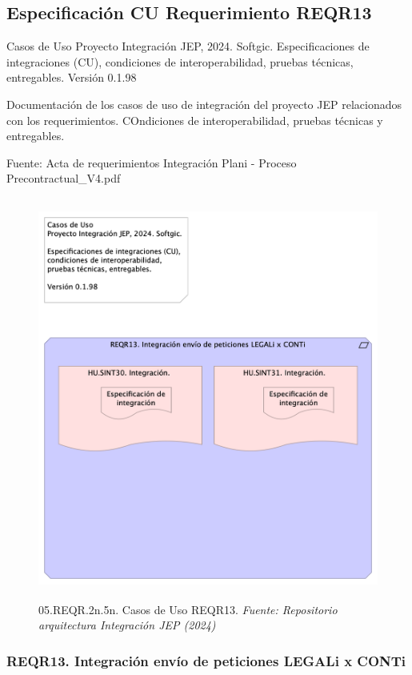 \documentclass[
  paper=a4,
  ,captions=tableheading
]{scrartcl}
\renewenvironment{quote}{\begin{customblockquote}\list{}{\rightmargin=0em\leftmargin=0em}%
\item\relax\color{blockquote-text}\ignorespaces}{\unskip\unskip\endlist\end{customblockquote}}
\begin{document}
\subsection{Especificación CU Requerimiento
REQR13}\label{sec:especificaciuxf3n-cu-requerimiento-reqr13}

\begin{quote}
Casos de Uso Proyecto Integración JEP, 2024. Softgic. Especificaciones
de integraciones (CU), condiciones de interoperabilidad, pruebas
técnicas, entregables. Versión 0.1.98
\end{quote}

Documentación de los casos de uso de integración del proyecto JEP
relacionados con los requerimientos. COndiciones de interoperabilidad,
pruebas técnicas y entregables.

Fuente: Acta de requerimientos Integración Plani - Proceso
Precontractual\_V4.pdf

\begin{figure}
\centering
\includegraphics[width=\textwidth,height=5.20833in]{images/05.REQR.2n.5n.CasosdeUsoREQR13.png}
\caption{05.REQR.2n.5n. Casos de Uso REQR13. \emph{Fuente: Repositorio
arquitectura Integración JEP
(2024)}}\label{fig:id-d6e0a0d4192e4eb6955c7363e93a0bf5}
\end{figure}

\subsubsection{REQR13. Integración envío de peticiones LEGALi x
CONTi}\label{sec:reqr13.-integraciuxf3n-envuxedo-de-peticiones-legali-x-conti-1}
\end{document}
